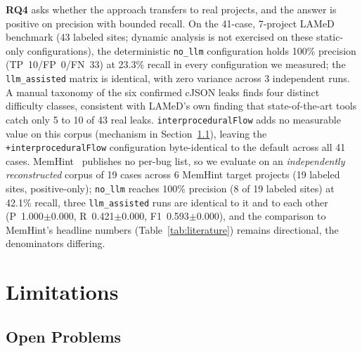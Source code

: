 \documentclass[a4paper]{llncs}
\begin{document}
\textbf{RQ4} asks whether the approach transfers to real projects, and
the answer is positive on precision with bounded recall. On the 41-case,
7-project LAMeD benchmark (43 labeled sites; dynamic
analysis is not exercised on these static-only configurations), the
deterministic \texttt{no\_llm} configuration holds 100\% precision
(TP~10/FP~0/FN~33) at 23.3\% recall in every configuration we measured;
the \texttt{llm\_assisted} matrix is identical, with zero
variance across 3 independent runs. A manual taxonomy of the six
confirmed cJSON leaks finds four distinct difficulty
classes, consistent with LAMeD's own finding that
state-of-the-art tools catch only 5 to 10 of 43 real leaks.
\texttt{interproceduralFlow} adds no measurable value on this corpus
(mechanism in Section~\ref{sec:openproblems}), leaving the
\texttt{+interproceduralFlow} configuration byte-identical
to the default across all 41 cases. MemHint~\cite{memhint} publishes no
per-bug list, so we evaluate on an \emph{independently reconstructed}
corpus of 19 cases across 6 MemHint target projects (19 labeled
sites,
positive-only); \texttt{no\_llm} reaches 100\% precision (8 of 19
labeled sites) at 42.1\% recall, three \texttt{llm\_assisted} runs
are identical to it and to each other (P~1.000$\pm$0.000,
R~0.421$\pm$0.000, F1~0.593$\pm$0.000), and the comparison to MemHint's
headline numbers (Table~\ref{tab:literature}) remains directional,
the denominators differing.

\noindent{}

\section{Limitations}
\label{sec:discussion}

\subsection{Open Problems}
\label{sec:openproblems}
\end{document}
